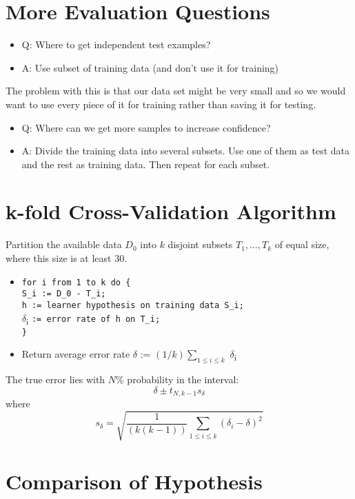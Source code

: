 \documentclass[11pt]{article}
\begin{document}
\section{More Evaluation Questions}
\label{sec:org3391730}
\begin{itemize}
\item Q: Where to get independent test examples?
\item A: Use subset of training data (and don't use it for training)
\end{itemize}
The problem with this is that our data set might be very small and so we would want to use every piece of it for training rather than saving it for testing.
\begin{itemize}
\item Q: Where can we get more samples to increase confidence?
\item A: Divide the training data into several subsets. Use one of them as test data and the rest as training data. Then repeat for each subset.
\end{itemize}

\section{k-fold Cross-Validation Algorithm}
\label{sec:orgc34f1ec}
Partition the available data \(D_0\) into \(k\) disjoint subsets \(T_1, \ldots , T_k\) of equal size, where this size is at least 30.
\begin{itemize}
\item \texttt{for i from 1 to k do \{}\\
 \texttt{S\_i := D\_0 - T\_i;}\\
 \texttt{h := learner hypothesis on training data S\_i;}\\
 \(\delta\)\textsubscript{i} \texttt{:= error rate of h on T\_i;}\\
\texttt{\}}
\item Return average error rate \(\delta\) := \((1/k)\sum\limits_{1\le i\le k}\) \(\delta\)\textsubscript{i}
\end{itemize}
The true error lies with \(N\%\) probability in the interval:
\begin{equation}
\delta \pm t_{N,k-1} s_{\delta}
\end{equation}
where
\begin{equation}
s_{\delta} = \sqrt{\frac{1}{(k(k-1))} \sum\limits_{1\le i\le k}(\delta_i - \delta)^2}
\end{equation}
\section{Comparison of Hypothesis}
\label{sec:org7b117fa}
\end{document}
